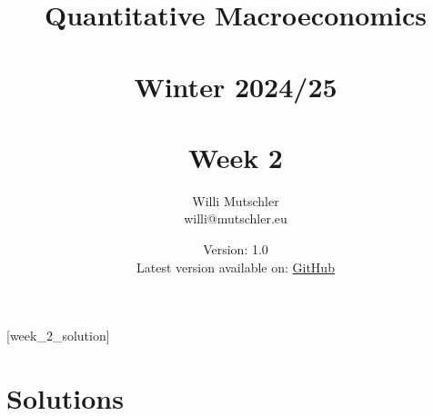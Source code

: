 
\newif\ifDisplaySolutions\DisplaySolutionstrue%


\title{Quantitative Macroeconomics\\~\\Winter 2024/25\\~\\Week 2}
\author{Willi Mutschler\\willi@mutschler.eu}
\date{Version: 1.0\\Latest version available on: \href{https://github.com/wmutschl/Quantitative-Macroeconomics/releases/latest/download/week_2.pdf}{GitHub}}
\maketitle\thispagestyle{empty}

\newpage
{}[week_2_solution]
\tableofcontents\thispagestyle{empty}\newpage

\setcounter{page}{1}
\newpage
\newpage
\newpage
\printbibliography%
\newpage

\ifDisplaySolutions%
\newpage
\appendix
\section{Solutions}

\fi
